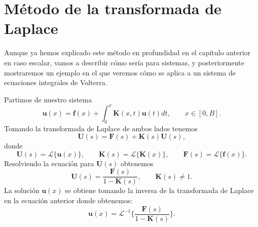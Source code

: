 \section{Método de la transformada de Laplace}
Aunque ya hemos explicado este método en profundidad en el capítulo anterior en caso escalar, vamos a describir cómo sería para sistemas, y posteriormente mostraremos un ejemplo en el que veremos cómo se aplica a un sistema de ecuaciones integrales de Volterra.

Partimos de nuestro sistema
\begin{equation}
	\textbf{u}(x) = \textbf{f}(x) + \int_0^x \textbf{K}(x,t)\textbf{u}(t)dt, \qquad x \in [0,B].
\end{equation}
Tomando la transformada de Laplace de ambos lados tenemos
\begin{equation}
	\textbf{U}(s) =\textbf{F}(s) + \mathcal{\textbf{K}}(s)\textbf{U}(s),
\end{equation}
donde
\begin{equation}
	\textbf{U}(s) = \mathcal{L}\{\textbf{u}(x)\}, \qquad \mathcal{\textbf{K}}(s) = \mathcal{L}\{\textbf{K}(x)\}, \qquad \textbf{F}(s) = \mathcal{L}\{\textbf{f}(x)\}.
\end{equation}
Resolviendo la ecuación para $\textbf{U}(s)$ obtenemos
\begin{equation}
	\textbf{U}(s) = \dfrac{\textbf{F}(s)}{1- \mathcal{\textbf{K}}(s)}, \qquad  \mathcal{\textbf{K}}(s) \neq 1.
\end{equation}
La solución $\textbf{u}(x)$ se obtiene tomando la inversa de la transformada de Laplace en la ecuación anterior donde obtenemos:
\begin{equation}
	\textbf{u}(x) = \mathcal{L}^{-1}\{\dfrac{\textbf{F}(s)}{1- \mathcal{\textbf{K}}(s)}\}.
\end{equation}
